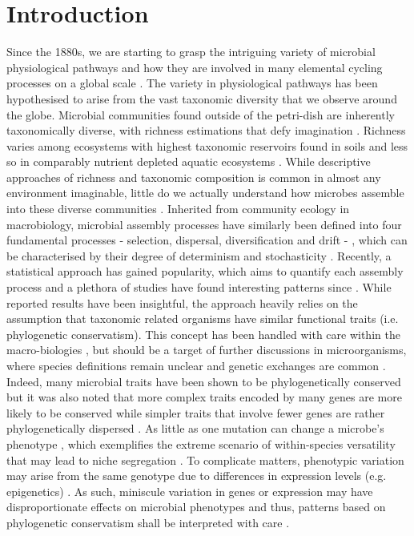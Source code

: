 \documentclass[12pt,a4paper]{article} %
\begin{document}
\section*{Introduction}
Since the 1880s, we are starting to grasp the intriguing variety of microbial physiological pathways and how they are involved in many elemental  cycling processes on a global scale \citep{Caumette2015}. The variety in physiological pathways has been hypothesised to arise from the vast taxonomic diversity that we observe around the globe. Microbial communities found outside of the petri-dish are inherently taxonomically diverse, with richness estimations that defy imagination \citep{Thompson2017, Louca2019}. Richness varies among ecosystems with highest taxonomic reservoirs found in soils and less so in comparably nutrient depleted aquatic ecosystems \citep{Thompson2017}. While descriptive approaches of richness and taxonomic composition is common in almost any environment imaginable, little do we actually understand how microbes assemble into these diverse communities \citep{Shade2017a, Shade2018}. Inherited from community ecology in macrobiology, microbial assembly processes have similarly been defined into four fundamental processes - selection, dispersal, diversification and drift - \citep{Vellend2010}, which can be characterised by their degree of determinism and stochasticity \citep{Zhou2017}. Recently, a statistical approach has gained popularity, which aims to quantify each assembly process \citep{Stegen2013a, Stegen2015a} and a plethora of studies have found interesting patterns since \citep{Langenheder2017, Graham2017a, Gweon2020}. While reported results have been insightful, the approach heavily relies on the assumption that taxonomic related organisms have similar functional traits (i.e. phylogenetic conservatism). This concept has been handled with care within the macro-biologies \citep{Losos2008, Warren2008}, but should be a target of further discussions in microorganisms, where species definitions remain unclear \citep{Achtman2008} and genetic exchanges are common \citep{Thomas2005}. Indeed, many microbial traits have been shown to be phylogenetically conserved \citep{Martiny2015} but it was also noted that more complex traits encoded by many genes are more likely to be conserved while simpler traits that involve fewer genes are rather phylogenetically dispersed \citep{Martiny2013a}. As little as one mutation can change a microbe's phenotype \citep{Forlsund2014}, which exemplifies the extreme scenario of within-species versatility that may lead to niche segregation \citep{VanRossum2020}. To complicate matters, phenotypic variation may arise from the same genotype due to differences in expression levels (e.g. epigenetics) \citep{Caumette2015}. As such, miniscule variation in genes or expression may have disproportionate effects on microbial phenotypes and thus, patterns based on phylogenetic conservatism shall be interpreted with care \citep{Achtman2008, Ackermann2015, Chase2018}.
\end{document}
